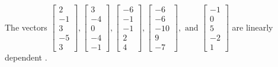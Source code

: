 \begin{exercise}
\begin{exerciseStatement}
  \end{exerciseStatement}
  \begin{exerciseAnswer}
   The vectors \(\left[\begin{array}{r}
2 \\
-1 \\
3 \\
-5 \\
3
\end{array}\right] , \left[\begin{array}{r}
3 \\
-4 \\
0 \\
-4 \\
-1
\end{array}\right] , \left[\begin{array}{r}
-6 \\
-1 \\
-1 \\
2 \\
4
\end{array}\right] , \left[\begin{array}{r}
-6 \\
-6 \\
-10 \\
9 \\
-7
\end{array}\right] , \text{ and } \left[\begin{array}{r}
-1 \\
0 \\
5 \\
-2 \\
1
\end{array}\right]\) are 
  	 linearly dependent  .
  


  \end{exerciseAnswer}
\end{exercise}